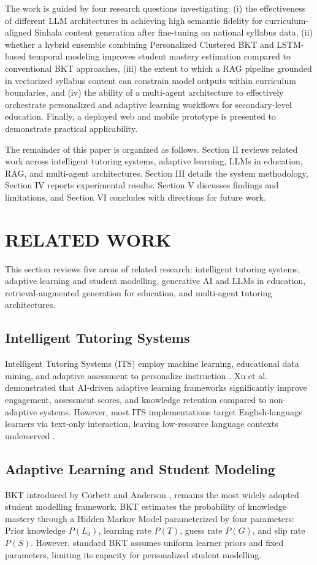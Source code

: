 \documentclass[conference]{IEEEtran}
\begin{document}
The work is guided by four research questions investigating: (i) the effectiveness of different LLM architectures in achieving high semantic fidelity for curriculum-aligned Sinhala content generation after fine-tuning on national syllabus data, (ii) whether a hybrid ensemble combining Personalized Clustered BKT and LSTM-based temporal modeling improves student mastery estimation compared to conventional BKT approaches, (iii) the extent to which a RAG pipeline grounded in vectorized syllabus content can constrain model outputs within curriculum boundaries, and (iv) the ability of a multi-agent architecture to effectively orchestrate personalized and adaptive learning workflows for secondary-level education. Finally, a deployed web and mobile prototype is presented to demonstrate practical applicability.

The remainder of this paper is organized as follows. Section II reviews related work across intelligent tutoring systems, adaptive learning, LLMs in education, RAG, and multi-agent architectures. Section III details the system methodology, Section IV reports experimental results. Section V discusses findings and limitations, and Section VI concludes with directions for future work.

\section{RELATED WORK}
This section reviews five areas of related research: intelligent tutoring systems, adaptive learning and student modelling, generative AI and LLMs in education, retrieval-augmented generation for education, and multi-agent tutoring architectures.

\subsection{Intelligent Tutoring Systems}
Intelligent Tutoring Systems (ITS) employ machine learning, educational data mining, and adaptive assessment to personalize instruction \cite{b6}. Xu et al. \cite{b7} demonstrated that AI-driven adaptive learning frameworks significantly improve engagement, assessment scores, and knowledge retention compared to non-adaptive systems. However, most ITS implementations target English-language learners via text-only interaction, leaving low-resource language contexts underserved \cite{b8}.

\subsection{Adaptive Learning and Student Modeling}
BKT introduced by Corbett and Anderson \cite{b9}, remains the most widely adopted student modelling framework. BKT estimates the probability of knowledge mastery through a Hidden Markov Model parameterized by four parameters: Prior knowledge $P(L_0)$, learning rate $P(T)$, guess rate $P(G)$, and slip rate $P(S)$. However, standard BKT assumes uniform learner priors and fixed parameters, limiting its capacity for personalized student modelling. 
\end{document}
